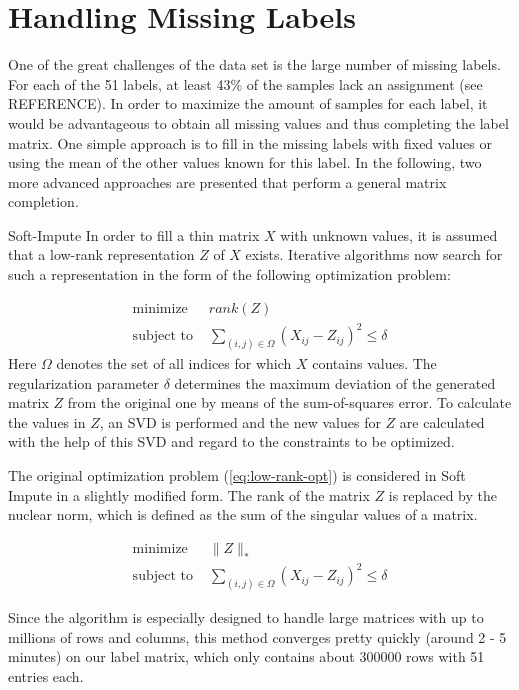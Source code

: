 \section{Handling Missing Labels}
One of the great challenges of the data set is the large number of missing labels. For each of the 51 labels, at least 43\% of the samples lack an assignment (see REFERENCE). In order to maximize the amount of samples for each label, it would be advantageous to obtain all missing values and thus completing the label matrix. One simple approach is to fill in the missing labels with fixed values or using the mean of the other values known for this label. In the following, two more advanced approaches are presented that perform a general matrix completion.

\begin{subsection}{Soft-Impute}
	In order to fill a thin matrix $X$ with unknown values, it is assumed that a low-rank representation $Z$ of $X$ exists. Iterative algorithms now search for such a representation in the form of the following optimization problem:
	
	\begin{align} \label{eq:low-rank-opt}
	\text{minimize } &\mathit{rank}(Z) \\
	\text{subject to } &\sum_{(i,j)\in \Omega} (X_{ij} - Z_{ij})^2 \leq \delta
	\end{align}
	Here $\Omega$ denotes the set of all indices for which $X$ contains values. The regularization parameter $\delta$ determines the maximum deviation of the generated matrix $Z$ from the original one by means of the sum-of-squares error. To calculate the values in $Z$, an SVD is performed and the new values for $Z$ are calculated with the help of this SVD and regard to the constraints to be optimized.\par
	The original optimization problem (\ref{eq:low-rank-opt}) is considered in Soft Impute in a slightly modified form. The rank of the matrix $Z$ is replaced by the nuclear norm, which is defined as the sum of the singular values of a matrix. \cite{mazumder2010spectral}
	
	\begin{align} \label{eq:low-rank-soft-opt}
	\text{minimize } & \| Z \|_* \\
	\text{subject to } &\sum_{(i,j)\in \Omega} (X_{ij} - Z_{ij})^2 \leq \delta
	\end{align}
	
	Since the algorithm is especially designed to handle large matrices with up to millions of rows and columns, this method converges pretty quickly (around 2 - 5 minutes) on our label matrix, which only contains about 300000 rows with 51 entries each. 
\end{subsection}

